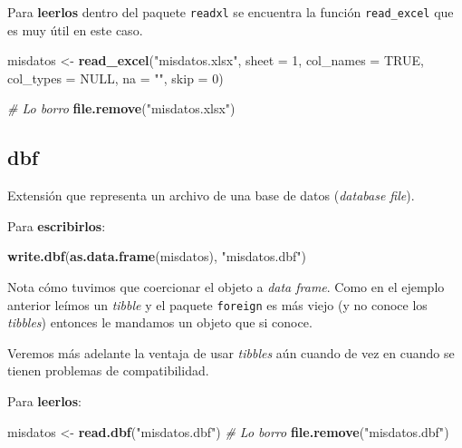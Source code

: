 \documentclass[]{article}
\newenvironment{Shaded}{\begin{snugshade}}{\end{snugshade}}
\newcommand{\KeywordTok}[1]{\textcolor[rgb]{0.13,0.29,0.53}{\textbf{#1}}}
\newcommand{\DataTypeTok}[1]{\textcolor[rgb]{0.13,0.29,0.53}{#1}}
\newcommand{\DecValTok}[1]{\textcolor[rgb]{0.00,0.00,0.81}{#1}}
\newcommand{\StringTok}[1]{\textcolor[rgb]{0.31,0.60,0.02}{#1}}
\newcommand{\CommentTok}[1]{\textcolor[rgb]{0.56,0.35,0.01}{\textit{#1}}}
\newcommand{\OtherTok}[1]{\textcolor[rgb]{0.56,0.35,0.01}{#1}}
\newcommand{\NormalTok}[1]{#1}
\begin{document}
Para \textbf{leerlos} dentro del paquete \texttt{readxl} se encuentra la
función \texttt{read\_excel} que es muy útil en este caso.

\begin{Shaded}
\begin{Highlighting}[]
\NormalTok{misdatos <-}\StringTok{ }\KeywordTok{read_excel}\NormalTok{(}\StringTok{"misdatos.xlsx"}\NormalTok{, }\DataTypeTok{sheet =} \DecValTok{1}\NormalTok{, }\DataTypeTok{col_names =} \OtherTok{TRUE}\NormalTok{, }
\DataTypeTok{col_types =} \OtherTok{NULL}\NormalTok{, }\DataTypeTok{na =} \StringTok{""}\NormalTok{, }\DataTypeTok{skip =} \DecValTok{0}\NormalTok{)}

\CommentTok{# Lo borro}
\KeywordTok{file.remove}\NormalTok{(}\StringTok{"misdatos.xlsx"}\NormalTok{)}
\end{Highlighting}
\end{Shaded}

\subsection{dbf}\label{dbf}

Extensión que representa un archivo de una base de datos (\emph{database
file}).

Para \textbf{escribirlos}:

\begin{Shaded}
\begin{Highlighting}[]
\KeywordTok{write.dbf}\NormalTok{(}\KeywordTok{as.data.frame}\NormalTok{(misdatos), }\StringTok{"misdatos.dbf"}\NormalTok{)}
\end{Highlighting}
\end{Shaded}

Nota cómo tuvimos que coercionar el objeto a \emph{data frame}. Como en
el ejemplo anterior leímos un \emph{tibble} y el paquete
\texttt{foreign} es más viejo (y no conoce los \emph{tibbles}) entonces
le mandamos un objeto que si conoce.

Veremos más adelante la ventaja de usar \emph{tibbles} aún cuando de vez
en cuando se tienen problemas de compatibilidad.

Para \textbf{leerlos}:

\begin{Shaded}
\begin{Highlighting}[]
\NormalTok{misdatos <-}\StringTok{ }\KeywordTok{read.dbf}\NormalTok{(}\StringTok{"misdatos.dbf"}\NormalTok{)}
\CommentTok{# Lo borro}
\KeywordTok{file.remove}\NormalTok{(}\StringTok{"misdatos.dbf"}\NormalTok{)}
\end{Highlighting}
\end{Shaded}
\end{document}
